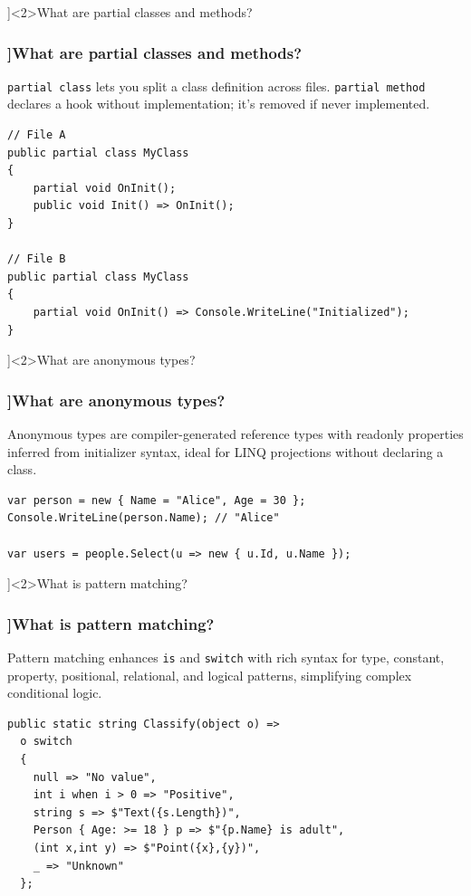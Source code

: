 \QuestionSlide[\CategoryBadge[LangColor!20]{Language Feature}]<2>{What are partial classes and methods?}
\begin{frame}[fragile]
  \frametitle{\AnswerTitle[\CategoryBadge[LangColor!20]{Language Feature}]{What are partial classes and methods?}}

  {\footnotesize
    \texttt{partial class} lets you split a class definition across files.  
    \texttt{partial method} declares a hook without implementation; it’s removed if never implemented.
  }

  \begin{verbatim}
// File A
public partial class MyClass
{
    partial void OnInit();
    public void Init() => OnInit();
}

// File B
public partial class MyClass
{
    partial void OnInit() => Console.WriteLine("Initialized");
}
  \end{verbatim}
\end{frame}

\QuestionSlide[\CategoryBadge[LangColor!20]{Language Feature}]<2>{What are anonymous types?}
\begin{frame}[fragile]
  \frametitle{\AnswerTitle[\CategoryBadge[LangColor!20]{Language Feature}]{What are anonymous types?}}

  {\footnotesize
    Anonymous types are compiler-generated reference types with readonly properties inferred from initializer syntax, ideal for LINQ projections without declaring a class.
  }

  \begin{verbatim}
var person = new { Name = "Alice", Age = 30 };
Console.WriteLine(person.Name); // "Alice"

var users = people.Select(u => new { u.Id, u.Name });
  \end{verbatim}
\end{frame}

\QuestionSlide[\CategoryBadge[LangColor!20]{Language Feature}]<2>{What is pattern matching?}
\begin{frame}[fragile]
  \frametitle{\AnswerTitle[\CategoryBadge[LangColor!20]{Language Feature}]{What is pattern matching?}}

  {\footnotesize
    Pattern matching enhances \texttt{is} and \texttt{switch} with rich syntax for type, constant, property, positional, relational, and logical patterns, simplifying complex conditional logic.
  }

  \begin{verbatim}
public static string Classify(object o) =>
  o switch
  {
    null => "No value",
    int i when i > 0 => "Positive",
    string s => $"Text({s.Length})",
    Person { Age: >= 18 } p => $"{p.Name} is adult",
    (int x,int y) => $"Point({x},{y})",
    _ => "Unknown"
  };
  \end{verbatim}
\end{frame}

